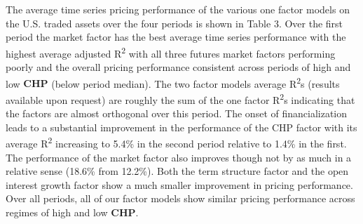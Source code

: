 \documentclass[11pt, letterpaper, doublespacing]{article}
\begin{document}
The average time series pricing performance of the various one factor
models on the U.S. traded assets over the four periods is shown in Table
3. Over the first period the market factor has the best average time
series performance with the highest average adjusted
R\textsuperscript{2} with all three futures market factors performing
poorly and the overall pricing performance consistent across periods of
high and low \(\mathbf{CHP}\) (below period median). The two factor
models average R\textsuperscript{2}s (results available upon request)
are roughly the sum of the one factor R\textsuperscript{2}s indicating
that the factors are almost orthogonal over this period. The onset of
financialization leads to a substantial improvement in the performance
of the CHP factor with its average R\textsuperscript{2} increasing to
5.4\% in the second period relative to 1.4\% in the first. The
performance of the market factor also improves though not by as much in
a relative sense (18.6\% from 12.2\%). Both the term structure factor
and the open interest growth factor show a much smaller improvement in
pricing performance. Over all periods, all of our factor models show
similar pricing performance across regimes of high and low
\(\mathbf{CHP}\).
\end{document}
